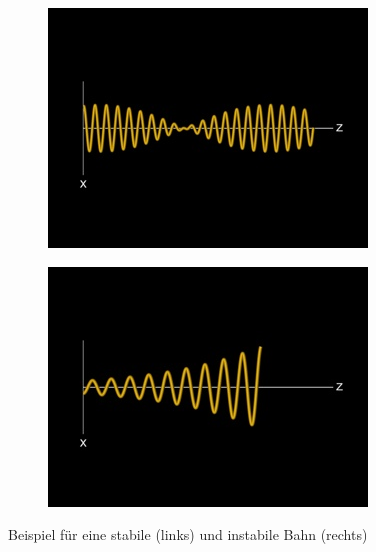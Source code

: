 \begin{figure}[h]
\centering
\begin{subfigure}{0.4\textwidth}
\includegraphics[width=\textwidth]{img/xzs}
\end{subfigure}
\begin{subfigure}{0.4\textwidth}
\includegraphics[width=\textwidth]{img/xzi}
\end{subfigure} 
\caption{Beispiel für eine stabile (links) und instabile Bahn (rechts)}
\end{figure}

